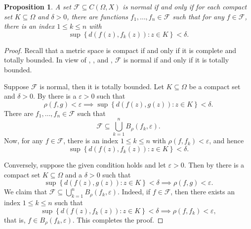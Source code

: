 \documentclass[11pt]{article}
\theoremstyle{thmstyle}
\newtheorem{proposition}[theorem]{Proposition}
\theoremstyle{defstyle}
\newcommand{\scrF}{\mathscr{F}}
\renewcommand{\le}{\leqslant}
\begin{document}
\begin{proposition}
    A set $\scrF\subseteq C(\Omega, X)$ is normal if and only if for each compact set $K\subseteq\Omega$ and $\delta > 0$, there are functions $f_1,\dots,f_n\in\scrF$ such that for any $f\in\scrF$, there is an index $1\le k\le n$ with 
    \begin{equation*}
        \sup\left\{d(f(z), f_k(z))\colon z\in K\right\} < \delta.
    \end{equation*}
\end{proposition}
\begin{proof}
    Recall that a metric space is compact if and only if it is complete and totally bounded. In view of , , and , $\scrF$ is normal if and only if it is totally bounded.

    Suppose $\scrF$ is normal, then it is totally bounded. Let $K\subseteq\Omega$ be a compact set and $\delta > 0$. By  there is a $\varepsilon > 0$ such that 
    \begin{equation*}
        \rho(f, g) < \varepsilon\implies\sup\left\{d(f(z), g(z))\colon z\in K\right\} < \delta.
    \end{equation*}
    There are $f_1,\dots, f_n\in\scrF$ such that 
    \begin{equation*}
        \scrF\subseteq \bigcup_{k = 1}^n B_\rho\left(f_k, \varepsilon\right).
    \end{equation*}
    Now, for any $f\in\scrF$, there is an index $1\le k\le n$ with $\rho(f, f_k) < \varepsilon$, and hence 
    \begin{equation*}
        \sup\left\{d(f(z), f_k(z))\colon z\in K\right\} < \delta.
    \end{equation*}

    Conversely, suppose the given condition holds and let $\varepsilon > 0$. Then by  there is a compact set $K\subseteq\Omega$ and a $\delta > 0$ such that 
    \begin{equation*}
        \sup\left\{d(f(z), g(z))\colon z\in K\right\} < \delta\implies\rho(f, g) < \varepsilon.
    \end{equation*}
    We claim that $\displaystyle\scrF\subseteq\bigcup_{k = 1}^n B_\rho(f_k, \varepsilon)$. Indeed, if $f\in\scrF$, then there exists an index $1\le k\le n$ such that 
    \begin{equation*}
        \sup\left\{d(f(z), f_k(z))\colon z\in K\right\} < \delta \implies \rho(f, f_k) < \varepsilon,
    \end{equation*}
    that is, $f\in B_\rho(f_k, \varepsilon)$. This completes the proof.
\end{proof}
\end{document}

